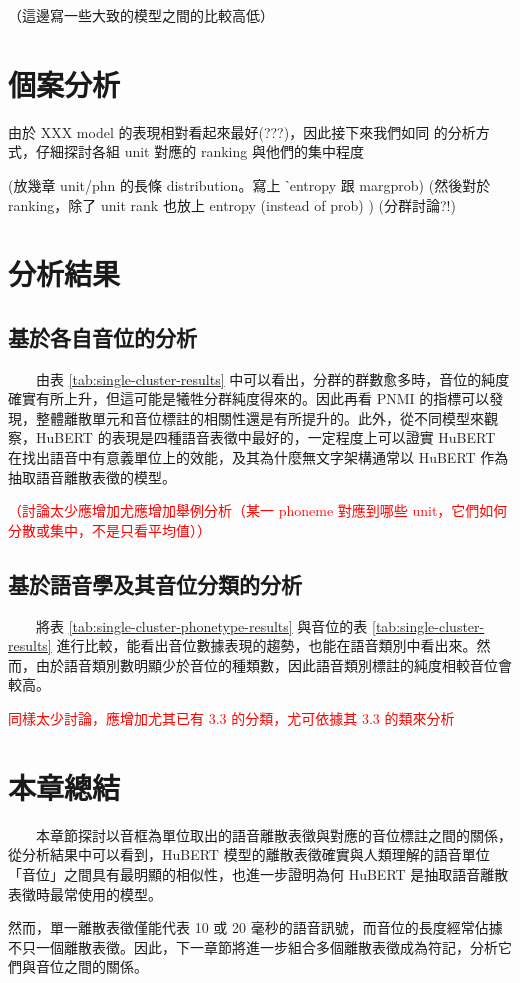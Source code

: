 （這邊寫一些大致的模型之間的比較高低）

\section{個案分析}

由於 XXX model 的表現相對看起來最好(???)，因此接下來我們如同  的分析方式，仔細探討各組 unit 對應的 ranking 與他們的集中程度

(放幾章 unit/phn 的長條 distribution。寫上 ˋentropy 跟 margprob)
(然後對於 ranking，除了 unit rank 也放上 entropy (instead of prob) )
(分群討論?!)


\section{分析結果}

\subsection{基於各自音位的分析}



　　由表 \ref{tab:single-cluster-results} 中可以看出，分群的群數愈多時，音位的純度確實有所上升，但這可能是犧牲分群純度得來的。因此再看 PNMI 的指標可以發現，整體離散單元和音位標註的相關性還是有所提升的。此外，從不同模型來觀察，HuBERT 的表現是四種語音表徵中最好的，一定程度上可以證實 HuBERT 在找出語音中有意義單位上的效能，及其為什麼無文字架構通常以 HuBERT 作為抽取語音離散表徵的模型。

\textcolor{red}{（討論太少應增加尤應增加舉例分析（某一 phoneme 對應到哪些 unit，它們如何分散或集中，不是只看平均值））}

\subsection{基於語音學及其音位分類的分析}



　　將表 \ref{tab:single-cluster-phonetype-results} 與音位的表 \ref{tab:single-cluster-results} 進行比較，能看出音位數據表現的趨勢，也能在語音類別中看出來。然而，由於語音類別數明顯少於音位的種類數，因此語音類別標註的純度相較音位會較高。

\textcolor{red}{同樣太少討論，應增加尤其已有 3.3 的分類，尤可依據其 3.3 的類來分析}

\section{本章總結}

　　本章節探討以音框為單位取出的語音離散表徵與對應的音位標註之間的關係，從分析結果中可以看到，HuBERT 模型的離散表徵確實與人類理解的語音單位「音位」之間具有最明顯的相似性，也進一步證明為何 HuBERT 是抽取語音離散表徵時最常使用的模型。

        然而，單一離散表徵僅能代表 10 或 20 毫秒的語音訊號，而音位的長度經常佔據不只一個離散表徵。因此，下一章節將進一步組合多個離散表徵成為符記，分析它們與音位之間的關係。


